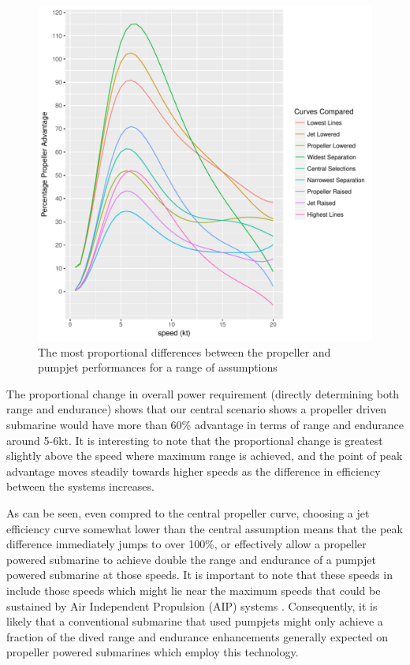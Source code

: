 \documentclass{article}\usepackage[]{graphicx}\usepackage[]{color}
\makeatletter
\def\maxwidth{ %
  \ifdim\Gin@nat@width>\linewidth
    \linewidth
  \else
    \Gin@nat@width
  \fi
}
\newenvironment{knitrout}{}{} %
\makeatother
\begin{document}
\begin{figure}
\begin{knitrout}
\color{fgcolor}

{\centering \includegraphics[width=\maxwidth]{figures/plots-plot_proportions-1} 

}



\end{knitrout}
\caption{The most proportional differences between the propeller and pumpjet performances for a range of assumptions}
\label{fig:all_proportions}
\end{figure}

The proportional change in overall power requirement (directly determining both range and endurance) shows that our central scenario shows a propeller driven submarine would have more than 60\% advantage in terms of range and endurance around 5-6kt. It is interesting to note that the proportional change is greatest slightly above the speed where maximum range is achieved, and the point of peak advantage moves steadily towards higher speeds as the difference in efficiency between the systems increases.

As can be seen, even compred to the central propeller curve, choosing a jet efficiency curve somewhat lower than the central assumption means that the peak difference immediately jumps to over 100\%, or effectively allow a propeller powered submarine to achieve double the range and endurance of a pumpjet powered submarine at those speeds.  It is important to note that these speeds in include those speeds which might lie near the maximum speeds that could be sustained by Air Independent Propulsion (AIP) systems \parencite[100]{stanford2017}.  Consequently, it is likely that a conventional submarine that used pumpjets might only achieve a fraction of the dived range and endurance enhancements generally expected on propeller powered submarines which employ this technology.
\end{document}

